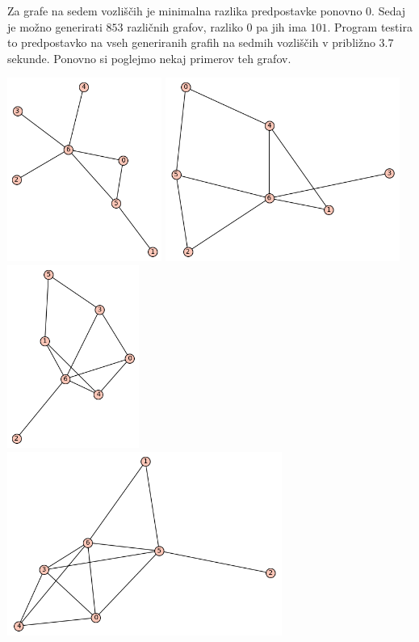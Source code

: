 \documentclass[10pt, a4paper]{article}
\begin{document}
Za grafe na sedem vozliščih je minimalna razlika predpostavke ponovno $0$. Sedaj je možno generirati $853$ različnih grafov, razliko $0$ pa jih ima $101$. Program testira to predpostavko na vseh generiranih grafih na sedmih vozliščih v približno $3.7$ sekunde. Ponovno si poglejmo nekaj primerov teh grafov.

\begin{center}
\includegraphics[height=6cm]{min_graf_7_1}
\includegraphics[height=6cm]{min_graf_7_2}
\includegraphics[height=6cm]{min_graf_7_3}
\includegraphics[height=6cm]{min_graf_7_4}

\end{center}
\end{document}
